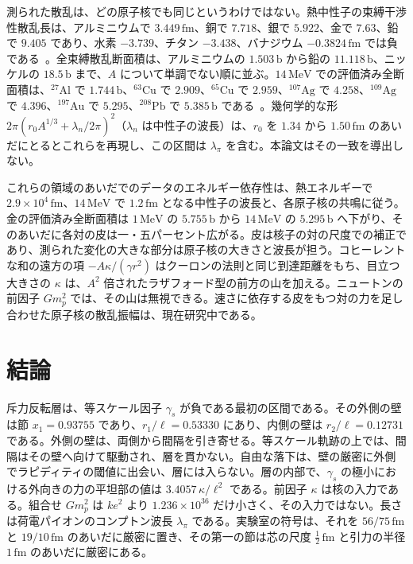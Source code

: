 \documentclass[a4paper]{article}
\begin{document}
測られた散乱は、どの原子核でも同じというわけではない。熱中性子の束縛干渉性散乱長は、アルミニウムで \(3.449\,\mathrm{fm}\)、銅で \(7.718\)、銀で \(5.922\)、金で \(7.63\)、鉛で \(9.405\) であり、水素 \(-3.739\)、チタン \(-3.438\)、バナジウム \(-0.3824\,\mathrm{fm}\) では負である~\cite{sears1992}。全束縛散乱断面積は、アルミニウムの \(1.503\,\mathrm{b}\) から鉛の \(11.118\,\mathrm{b}\)、ニッケルの \(18.5\,\mathrm{b}\) まで、\(A\) について単調でない順に並ぶ。\(14\,\mathrm{MeV}\) での評価済み全断面積は、\({}^{27}\mathrm{Al}\) で \(1.744\,\mathrm{b}\)、\({}^{63}\mathrm{Cu}\) で \(2.909\)、\({}^{65}\mathrm{Cu}\) で \(2.959\)、\({}^{107}\mathrm{Ag}\) で \(4.258\)、\({}^{109}\mathrm{Ag}\) で \(4.396\)、\({}^{197}\mathrm{Au}\) で \(5.295\)、\({}^{208}\mathrm{Pb}\) で \(5.385\,\mathrm{b}\) である~\cite{endf8}。幾何学的な形 \(2\pi(r_0A^{1/3}+\lambda_n/2\pi)^{2}\)（\(\lambda_n\) は中性子の波長）は、\(r_0\) を \(1.34\) から \(1.50\,\mathrm{fm}\) のあいだにとるとこれらを再現し、この区間は \(\lambda_\pi\) を含む。本論文はその一致を導出しない。

これらの領域のあいだでのデータのエネルギー依存性は、熱エネルギーで \(2.9\times 10^{4}\,\mathrm{fm}\)、\(14\,\mathrm{MeV}\) で \(1.2\,\mathrm{fm}\) となる中性子の波長と、各原子核の共鳴に従う。金の評価済み全断面積は \(1\,\mathrm{MeV}\) の \(5.755\,\mathrm{b}\) から \(14\,\mathrm{MeV}\) の \(5.295\,\mathrm{b}\) へ下がり、そのあいだに各対の皮は一・五パーセント広がる。皮は核子の対の尺度での補正であり、測られた変化の大きな部分は原子核の大きさと波長が担う。コヒーレントな和の遠方の項 \(-A\kappa/(\gamma r^{2})\) はクーロンの法則と同じ到達距離をもち、目立つ大きさの \(\kappa\) は、\(A^{2}\) 倍されたラザフォード型の前方の山を加える。ニュートンの前因子 \(Gm_p^{2}\) では、その山は無視できる。速さに依存する皮をもつ対の力を足し合わせた原子核の散乱振幅は、現在研究中である。

\section{結論}
\label{sec:conclusions}

斥力反転層は、等スケール因子 \(\gamma_s\) が負である最初の区間である。その外側の壁は節 \(x_1=0.93755\) であり、\(r_1/\ell=0.53330\) にあり、内側の壁は \(r_2/\ell=0.12731\) である。外側の壁は、両側から間隔を引き寄せる。等スケール軌跡の上では、間隔はその壁へ向けて駆動され、層を貫かない。自由な落下は、壁の厳密に外側でラピディティの閾値に出会い、層には入らない。層の内部で、\(\gamma_s\) の極小における外向きの力の平坦部の値は \(3.4057\,\kappa/\ell^{2}\) である。前因子 \(\kappa\) は核の入力である。組合せ \(G m_p^2\) は \(k e^2\) より \(1.236\times 10^{36}\) だけ小さく、その入力ではない。長さは荷電パイオンのコンプトン波長 \(\lambda_\pi\) である。実験室の符号は、それを \(56/75\,\mathrm{fm}\) と \(19/10\,\mathrm{fm}\) のあいだに厳密に置き、その第一の節は芯の尺度 \(\tfrac12\,\mathrm{fm}\) と引力の半径 \(1\,\mathrm{fm}\) のあいだに厳密にある。
\end{document}
